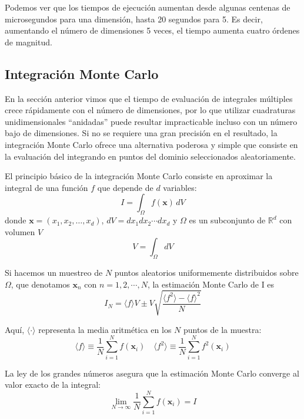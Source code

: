 Podemos ver que los tiempos de ejecución aumentan desde algunas centenas de microsegundos para una dimensión, hasta 20 segundos para 5. Es decir, aumentando el número de dimensiones 5 veces, el tiempo aumenta cuatro órdenes de magnitud. 



\subsection{Integración Monte Carlo}
En la sección anterior vimos que el tiempo de evaluación de integrales múltiples crece rápidamente con el número de dimensiones, por lo que utilizar cuadraturas unidimensionales ``anidadas'' puede resultar impracticable incluso con un número bajo de dimensiones. Si no se requiere una gran precisión en el resultado, la integración Monte Carlo ofrece una alternativa poderosa y simple que consiste en la evaluación del integrando en puntos del dominio seleccionados aleatoriamente. 

El principio básico de la integración Monte Carlo consiste en aproximar la integral de una función $f$ que depende de $d$ variables:
\begin{equation}\label{eq:intmc01}
 I = \int_{\Omega} f(\bm{x}) \, dV
\end{equation} 
donde $\bm{x} = (x_1, x_2, \ldots, x_d)$, $dV = dx_1 dx_2 \cdots dx_d$ y $\Omega$ es un subconjunto de $\mathbb{R}^d$ con volumen $V$
\[ V = \int_{\Omega} dV \]

Si hacemos un muestreo de $N$ puntos aleatorios uniformemente distribuidos sobre $\Omega$, que denotamos $\bm{x}_n$ con $n = 1, 2, \cdots, N$, la estimación Monte Carlo de I es
\begin{equation}\label{eq:intmc02}
 I_N = \langle f \rangle V \pm V \sqrt{ \frac{\langle f^2 \rangle - \langle f \rangle^2}{N}}
\end{equation} 

Aquí, $\langle \cdot \rangle$ representa la media aritmética en los $N$ puntos de la muestra:
\begin{equation}\label{eq:intmc03}
 \langle f \rangle \equiv \frac{1}{N} \sum_{i=1}^{N} f(\bm{x}_i) \quad \langle f^2 \rangle \equiv \frac{1}{N} \sum_{i=1}^{N} f^2(\bm{x}_i)
\end{equation} 

La ley de los grandes números asegura que la estimación Monte Carlo converge al valor exacto de la integral:
\[ \lim_{N\rightarrow \infty} \frac{1}{N} \sum_{i=1}^{N} f(\bm{x}_i) = I \]

